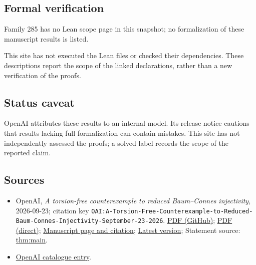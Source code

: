 \documentclass[11pt]{article}
\begin{document}
\subsection{Formal verification}
Family 285 has no Lean scope page in this snapshot; no formalization of these manuscript results is listed.

This site has not executed the Lean files or checked their dependencies. These descriptions report the scope of the linked declarations, rather than a new verification of the proofs.

\subsection{Status caveat}
OpenAI attributes these results to an internal model. Its release notice cautions that results lacking full formalization can contain mistakes. This site has not independently assessed the proofs; a solved label records the scope of the reported claim.

\subsection{Sources}
\begin{itemize}
\item OpenAI, \emph{A torsion-free counterexample to reduced Baum–Connes injectivity}, 2026-09-23; citation key \texttt{OAI:A-Torsion-Free-Counterexample-to-Reduced-Baum-Connes-Injectivity-September-23-2026}. \href{https://github.com/openai/math/blob/adc7f1241b42e322a6451854ab7e4b4c146bf78a/preprints/A-Torsion-Free-Counterexample-to-Reduced-Baum-Connes-Injectivity-September-23-2026/paper.pdf}{PDF (GitHub)}; \href{https://github.com/openai/math/raw/adc7f1241b42e322a6451854ab7e4b4c146bf78a/preprints/A-Torsion-Free-Counterexample-to-Reduced-Baum-Connes-Injectivity-September-23-2026/paper.pdf}{PDF (direct)}; \href{https://github.com/openai/math/blob/adc7f1241b42e322a6451854ab7e4b4c146bf78a/preprints/A-Torsion-Free-Counterexample-to-Reduced-Baum-Connes-Injectivity-September-23-2026/README.md}{Manuscript page and citation}; \href{https://github.com/openai/math/blob/main/preprints/A-Torsion-Free-Counterexample-to-Reduced-Baum-Connes-Injectivity-September-23-2026/paper.pdf}{Latest version}; Statement source: \href{https://github.com/openai/math/blob/adc7f1241b42e322a6451854ab7e4b4c146bf78a/preprints/A-Torsion-Free-Counterexample-to-Reduced-Baum-Connes-Injectivity-September-23-2026/build/sections/00\_introduction.tex\#L18}{thm:main}.
\item \href{https://github.com/openai/math/blob/adc7f1241b42e322a6451854ab7e4b4c146bf78a/CONTENTS.md}{OpenAI catalogue entry}.
\end{itemize}
\end{document}
